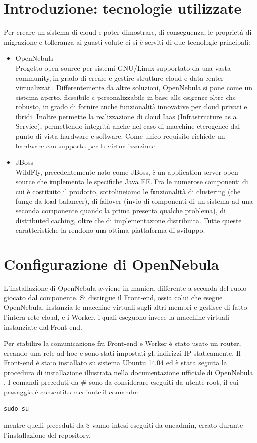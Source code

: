 \documentclass[twoside]{article}
\begin{document}
\section{Introduzione: tecnologie utilizzate}
Per creare un sistema di cloud e poter dimostrare, di conseguenza, le proprietà di migrazione e
tolleranza ai guasti volute ci si è serviti di due tecnologie principali:
\begin{itemize}
	\item OpenNebula \\
		  Progetto open source per sistemi GNU/Linux supportato da una vasta community, in grado di
		  creare e gestire strutture cloud e data center virtualizzati. Differentemente da altre soluzioni,
		  OpenNebula si pone come un sistema aperto, flessibile e personalizzabile in base alle esigenze
		  oltre che robusto, in grado di fornire anche funzionalità innovative per cloud privati e ibridi.
		  Inoltre permette la realizzazione di cloud Iaas (Infrastructure as a Service), permettendo integrità
		  anche nel caso di macchine eterogenee dal punto di vista hardware e software. Come unico requisito
		  richiede un hardware con supporto per la virtualizzazione.
	\item JBoss \\
		  WildFly, precedentemente noto come JBoss, è un application server open source che implementa
		  le specifiche Java EE. Fra le numerose componenti di cui è costituito il prodotto, sottolineiamo
		  le funzionalità di clustering (che funge da load balancer), di failover (invio di componenti di
		  un sistema ad una seconda componente quando la prima presenta qualche problema), di distributed
		  caching, oltre che di implementazione distribuita. Tutte queste caratteristiche la rendono una
		  ottima piattaforma di sviluppo.
\end{itemize}

\section{Configurazione di OpenNebula}
L'installazione di OpenNebula avviene in maniera differente a seconda del ruolo giocato dal componente.
Si distingue il Front-end, ossia colui che esegue OpenNebula, instanzia le macchine virtuali sugli altri
membri e gestisce di fatto l'intera rete cloud, e i Worker, i quali eseguono invece la macchine virtuali
instanziate dal Front-end.

Per stabilire la comunicazione fra Front-end e Worker è stato usato un router, creando una rete ad hoc 
e sono stati impostati gli indirizzi IP staticamente.
Il Front-end è stato installato su sistema Ubuntu 14.04 ed è stata seguita
la procedura di installazione illustrata nella documentazione ufficiale di OpenNebula \cite{bib:opennebula}.
I comandi preceduti da \# sono da considerare eseguiti da utente root, il cui passaggio è consentito
mediante il comando:
\begin{lstlisting}[frame=trBL]
sudo su
\end{lstlisting}
mentre quelli preceduti da \$ vanno intesi eseguiti da oneadmin, creato durante l'installazione del
repository.
\end{document}
